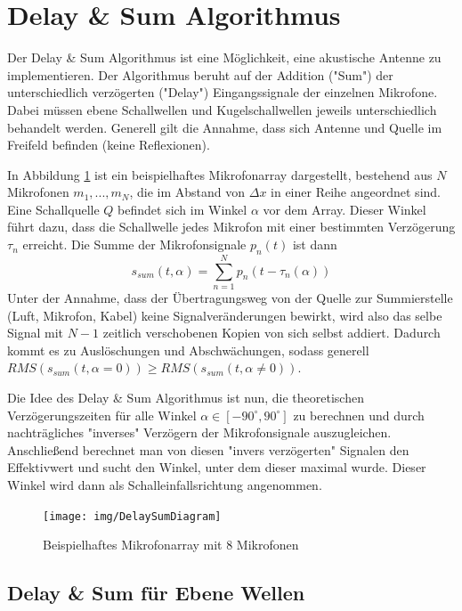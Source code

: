 \section{Delay \& Sum Algorithmus}

	Der Delay \& Sum Algorithmus ist eine Möglichkeit, eine akustische Antenne zu implementieren. Der Algorithmus beruht auf der Addition ("Sum") der unterschiedlich verzögerten ("Delay") Eingangssignale der einzelnen Mikrofone. Dabei müssen ebene Schallwellen und Kugelschallwellen jeweils unterschiedlich behandelt werden. Generell gilt die Annahme, dass sich Antenne und Quelle im Freifeld befinden (keine Reflexionen).
	
	In Abbildung \ref{fig:das_basic} ist ein beispielhaftes Mikrofonarray dargestellt, bestehend aus $N$ Mikrofonen $m_1,...,m_N$, die im Abstand von $\Delta x$ in einer Reihe angeordnet sind. Eine Schallquelle $Q$ befindet sich im Winkel $\alpha$ vor dem Array.
	Dieser Winkel führt dazu, dass die Schallwelle jedes Mikrofon mit einer bestimmten Verzögerung $\tau_n$ erreicht.
	Die Summe der Mikrofonsignale $p_n(t)$ ist dann
	\begin{equation}
		s_{sum}(t, \alpha) = \sum_{n=1}^{N} p_n(t - \tau_n(\alpha))
	\end{equation}
	Unter der Annahme, dass der Übertragungsweg von der Quelle zur Summierstelle (Luft, Mikrofon, Kabel) keine Signalveränderungen bewirkt, wird also das selbe Signal mit $N-1$ zeitlich verschobenen Kopien von sich selbst addiert.
	Dadurch kommt es zu Auslöschungen und Abschwächungen, sodass generell $RMS(s_{sum}(t, \alpha=0)) \ge RMS(s_{sum}(t, \alpha \ne 0))$.
	
	Die Idee des Delay \& Sum Algorithmus ist nun, die theoretischen Verzögerungszeiten für alle Winkel $\alpha \in [-90^{\circ}, 90^{\circ}]$ zu berechnen und durch nachträgliches "inverses" Verzögern der Mikrofonsignale auszugleichen.
	Anschließend berechnet man von diesen "invers verzögerten" Signalen den Effektivwert und sucht den Winkel, unter dem dieser maximal wurde.
	Dieser Winkel wird dann als Schalleinfallsrichtung angenommen.
	
	\begin{figure}[h]
		\begin{center}
		\texttt{[image: img/DelaySumDiagram]}
		\caption{Beispielhaftes Mikrofonarray mit 8 Mikrofonen}
		\label{fig:das_basic}
		\end{center}		
	\end{figure}

\subsection{Delay \& Sum für Ebene Wellen}
	

